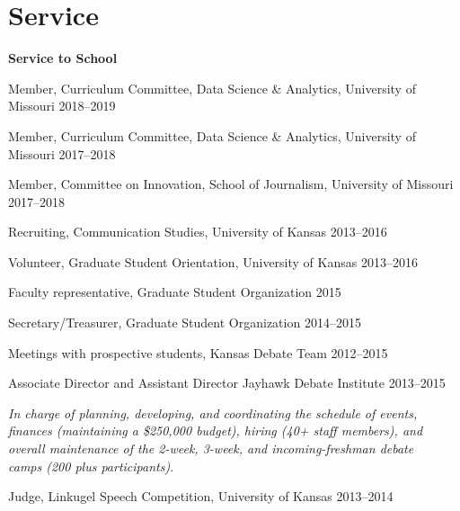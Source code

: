 \section{Service}

\textbf{Service to School}
  \begin{innerlist}
    \item Member, Curriculum Committee, Data Science \& Analytics, University of Missouri \hfill 2018--2019
    \item Member, Curriculum Committee, Data Science \& Analytics, University of Missouri \hfill 2017--2018
    \item Member, Committee on Innovation, School of Journalism, University of Missouri \hfill 2017--2018
    \item Recruiting, Communication Studies, University of Kansas \hfill 2013--2016
    \item Volunteer, Graduate Student Orientation, University of Kansas \hfill 2013--2016
    \item Faculty representative, Graduate Student Organization \hfill 2015
    \item Secretary/Treasurer, Graduate Student Organization \hfill 2014--2015
    \item Meetings with prospective students, Kansas Debate Team \hfill 2012--2015
    \item Associate Director and Assistant Director Jayhawk Debate Institute \hfill 2013--2015
    \begin{outerlist}
      \item[]\textit{In charge of planning, developing, and coordinating the schedule of events,\\
        finances (maintaining a \$250,000 budget), hiring (40+ staff members), and\\
        overall maintenance of the 2-week, 3-week, and incoming-freshman debate \\
        camps (200 plus participants)}.
    \end{outerlist} \vspace{1em}
    \item Judge, Linkugel Speech Competition, University of Kansas \hfill 2013--2014
    \end{innerlist}\vspace{1em}

